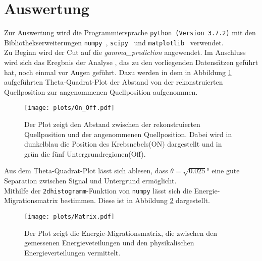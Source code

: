 \section{Auswertung}
Zur Auswertung wird die Programmiersprache \texttt{python (Version 3.7.2)} mit
den Bibliothekserweiterungen \texttt{numpy}~\cite{numpy}, \texttt{scipy}~\cite{scipy} und \texttt{matplotlib}~\cite{matplotlib} verwendet.\\
Zu Beginn wird der Cut auf die \textit{gamma\_prediction} angewendet. Im Anschluss wird sich das Eregbnis der Analyse \cite{FACTanalyse}, das zu den vorliegenden Datensätzen geführt hat, noch einmal vor Augen geführt. Dazu werden in dem in Abbildung \ref{fig:Theta2} aufgeführten Theta-Quadrat-Plot der Abstand von der rekonstruierten Quellposition zur angenommenen Quellposition aufgenommen. \\
\begin{figure}
  \centering
  \texttt{[image: plots/On\_Off.pdf]}
  \caption{Der Plot zeigt den Abstand zwischen der rekonstruierten Quellposition und der angenommenen Quellposition. Dabei wird in dunkelblau die Position des Krebsnebels(ON) dargestellt und in grün die fünf Untergrundregionen(Off).}
  \label{fig:Theta2}
\end{figure}
Aus dem Theta-Quadrat-Plot lässt sich ablesen, dass $\theta = \sqrt{0.025}\si{\degree}$ eine gute Separation zwischen Signal und Untergrund ermöglicht.\\
Mithilfe der \texttt{2dhistogramm}-Funktion von \texttt{numpy} lässt sich die Energie-Migrationsmatrix bestimmen. Diese ist in Abbildung \ref{fig:mig} dargestellt.\\
\begin{figure}
  \centering
  \texttt{[image: plots/Matrix.pdf]}
  \caption{Der Plot zeigt die Energie-Migrationsmatrix, die zwischen den gemessenen Energieveteilungen und den physikalischen Energieverteilungen vermittelt.}
  \label{fig:mig}
\end{figure}
